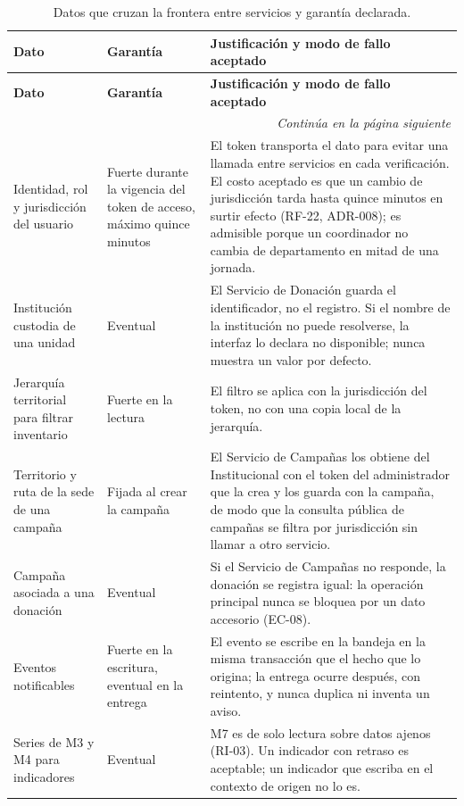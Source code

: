 \documentclass[11pt,a4paper]{article}
\newcommand{\contlinea}[1]{\multicolumn{#1}{r}{\footnotesize\itshape Continúa en la página siguiente}}
\begin{document}
\begin{longtable}{L{3.6cm} L{3.4cm} L{7.2cm}}
\caption{Datos que cruzan la frontera entre servicios y garantía declarada.}\label{tab:consistencia}\\
\toprule
\textbf{Dato} & \textbf{Garantía} & \textbf{Justificación y modo de fallo aceptado} \\
\midrule
\endfirsthead
\toprule
\textbf{Dato} & \textbf{Garantía} & \textbf{Justificación y modo de fallo aceptado} \\
\midrule
\endhead
\midrule
\contlinea{3} \\
\endfoot
\bottomrule
\endlastfoot
Identidad, rol y jurisdicción del usuario & Fuerte durante la vigencia del token de acceso, máximo quince minutos & El token transporta el dato para evitar una llamada entre servicios en cada verificación. El costo aceptado es que un cambio de jurisdicción tarda hasta quince minutos en surtir efecto (RF-22, ADR-008); es admisible porque un coordinador no cambia de departamento en mitad de una jornada. \\
Institución custodia de una unidad & Eventual & El Servicio de Donación guarda el identificador, no el registro. Si el nombre de la institución no puede resolverse, la interfaz lo declara no disponible; nunca muestra un valor por defecto. \\
Jerarquía territorial para filtrar inventario & Fuerte en la lectura & El filtro se aplica con la jurisdicción del token, no con una copia local de la jerarquía. \\
Territorio y ruta de la sede de una campaña & Fijada al crear la campaña & El Servicio de Campañas los obtiene del Institucional con el token del administrador que la crea y los guarda con la campaña, de modo que la consulta pública de campañas se filtra por jurisdicción sin llamar a otro servicio. \\
Campaña asociada a una donación & Eventual & Si el Servicio de Campañas no responde, la donación se registra igual: la operación principal nunca se bloquea por un dato accesorio (EC-08). \\
Eventos notificables & Fuerte en la escritura, eventual en la entrega & El evento se escribe en la bandeja en la misma transacción que el hecho que lo origina; la entrega ocurre después, con reintento, y nunca duplica ni inventa un aviso. \\
Series de M3 y M4 para indicadores & Eventual & M7 es de solo lectura sobre datos ajenos (RI-03). Un indicador con retraso es aceptable; un indicador que escriba en el contexto de origen no lo es. \\
\end{longtable}
\end{document}
